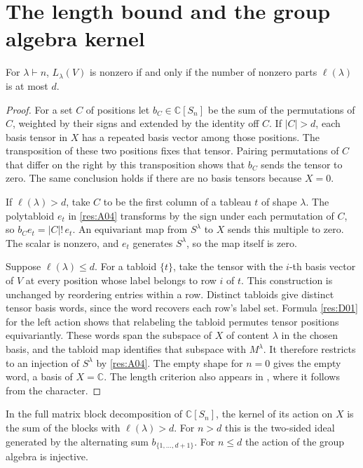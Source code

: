 \section{The length bound and the group algebra kernel}

\begin{theorem}
\label{res:D05}
For \(\lambda\vdash n\), \(L_\lambda(V)\) is nonzero if and only
if the number of nonzero parts \(\ell(\lambda)\) is at most \(d\).
\end{theorem}

\begin{proof}
For a set \(C\) of positions let \(b_C\in\mathbb C[S_n]\) be the
sum of the permutations of \(C\), weighted by their signs and
extended by the identity off \(C\). If \(|C|>d\), each basis
tensor in \(X\) has a repeated basis vector among those positions.
The transposition of these two positions fixes that tensor.
Pairing permutations of \(C\) that differ on the right by this
transposition shows that \(b_C\) sends the tensor to zero.
The same conclusion holds if there are no basis tensors because
\(X=0\).

If \(\ell(\lambda)>d\), take \(C\) to be the first column of a
tableau \(t\) of shape \(\lambda\). The polytabloid \(e_t\) in
\ref{res:A04} transforms
by the sign under each permutation of \(C\), so
\(b_C e_t=|C|!\,e_t\). An equivariant map from \(S^\lambda\) to
\(X\) sends this multiple to zero.
The scalar is nonzero, and \(e_t\) generates \(S^\lambda\), so
the map itself is zero.

Suppose \(\ell(\lambda)\leq d\). For a tabloid \(\{t\}\), take the
tensor with the \(i\)-th basis vector of \(V\) at every position whose
label belongs to row \(i\) of \(t\). This construction is unchanged
by reordering entries within a row. Distinct tabloids give
distinct tensor basis words, since the word recovers each row's
label set. Formula \ref{res:D01} for the left action shows that
relabeling the tabloid permutes tensor positions equivariantly.
These words span the subspace of \(X\) of content \(\lambda\)
in the chosen basis, and the tabloid map identifies that subspace
with \(M^\lambda\). It therefore restricts to an injection
of \(S^\lambda\) by \ref{res:A04}. The empty shape for \(n=0\)
gives the empty word, a basis of \(X=\mathbb C\).
The length criterion also appears in
\cite[Theorem 4.63]{etingof}, where it follows from the character.
\end{proof}

\begin{corollary}
\label{res:D06}
In the full matrix block decomposition of \(\mathbb C[S_n]\),
the kernel of its action on \(X\) is the sum of the blocks with
\(\ell(\lambda)>d\). For \(n>d\) this is the two-sided ideal
generated by the alternating sum \(b_{\{1,\ldots,d+1\}}\).
For \(n\leq d\) the action of the group algebra is injective.
\end{corollary}

